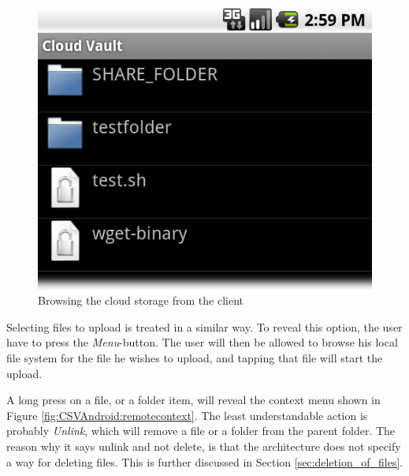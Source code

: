 \documentclass[pdftex,english,10pt,b5paper,twoside]{book}
\begin{document}
\begin{figure}[h!]
    \centering
    \includegraphics[scale=0.4]{client-remotebrowse.png}
    \caption{Browsing the cloud storage from the client}
    \label{fig:CSVAndroid:remotebrowse}
\end{figure}

Selecting files to upload is treated in a similar way. To reveal this option,
the user have to press the \emph{Menu}-button. The user will then be allowed to
browse his local file system for the file he wishes to upload, and tapping that
file will start the upload.

A long press on a file, or a folder item, will reveal the context menu shown in
Figure \ref{fig:CSVAndroid:remotecontext}. The least understandable action is
probably \emph{Unlink}, which will remove a file or a folder from the parent
folder.  The reason why it says unlink and not delete, is that the architecture
does not specify a way for deleting files. This is further discussed in Section
\ref{sec:deletion_of_files}.
\end{document}
